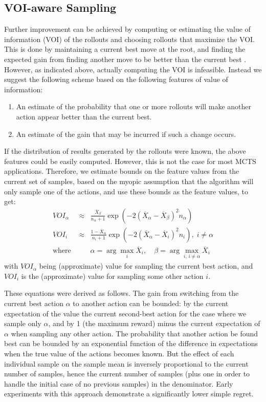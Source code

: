 \documentclass[letterpaper]{article}
\begin{document}
\subsection{VOI-aware Sampling}
\label{sec:voi-sampling}

Further improvement can be achieved by computing or estimating the
value of information (VOI) of the rollouts and choosing rollouts that
maximize the VOI. This is done by maintaining a current best move at the root,
and finding the expected gain from finding another move to be better than the
current best \cite{Russell.aima}.
However, as indicated above, actually computing the VOI is infeasible.
Instead we suggest the following scheme based on the following
features of value of information:
\begin{enumerate}
\item An estimate of the probability that one or more rollouts will make another action
appear better than the current best.
\item An estimate of the gain that may be incurred if such a change occurs.
\end{enumerate}

If the distribution of results generated by the rollouts were known, the
above features could be easily computed. However, this is not the case for
most MCTS applications. Therefore, we estimate bounds on the feature values from
the current set of samples, based on the myopic assumption that the algorithm will only
sample one of the actions, and use these bounds as the feature values, to get:
\begin{eqnarray}
VOI_\alpha&\approx&\frac {\overline X_\beta} {n_\alpha+1}
\exp\left(-2(\overline X_\alpha - \overline X_\beta)^2 n_\alpha\right)\\
VOI_i&\approx&\frac {1-\overline X_\alpha} {n_i+1}
\exp\left(-2(\overline X_\alpha - \overline X_i)^2 n_i\right),\; i\ne\alpha\nonumber\\
\mbox{where }&&\alpha=\arg\max_i \overline X_i,\quad
             \beta=\arg\max_{i,\,i\ne\alpha} \overline X_i\nonumber
\end{eqnarray}
with $VOI_{\alpha}$ being (approximate) value for sampling the current best action,
and $VOI_i$ is the (approximate) value for sampling some other action $i$. 

These equations were derived as follows. The gain from switching from the current best action $\alpha$ to another
action can be bounded:  by  the current expectation of the value the current second-best action
for the case where we sample only $\alpha$, and by 1 (the maximum reward) minus the current expectation
of $\alpha $ when sampling any other action. 
The probability that another action be found
best can be bounded by an exponential function of the difference in expectations when the true value
of the actions becomes known. But the effect of each individual sample on the sample mean
is inversely proportional to the current number of samples, hence the current number of samples (plus one
in order to handle the initial case of no previous samples) in the denominator.
Early experiments with this approach demonstrate a significantly lower simple regret.
\end{document}
